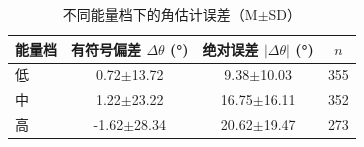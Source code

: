 \begin{table}[htbp]
  \centering
  \caption{不同能量档下的角估计误差（M$\pm$SD）}
  \label{tab:desc-ebin}
  \begin{tabular}{lccc}
    \toprule
    能量档 & 有符号偏差 $\Delta\theta$ (°) & 绝对误差 $|\Delta\theta|$ (°) & $n$ \\
    \midrule
    低 & 0.72$\pm$13.72 & 9.38$\pm$10.03 & 355 \\
    中 & 1.22$\pm$23.22 & 16.75$\pm$16.11 & 352 \\
    高 & -1.62$\pm$28.34 & 20.62$\pm$19.47 & 273 \\
    \bottomrule
  \end{tabular}
\end{table}
